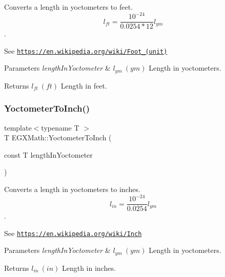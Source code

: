 Converts a length in yoctometers to feet. \[ l_{ft}= \frac{10^{-24}}{0.0254 * 12} l_{ym} \]. 

See \href{https://en.wikipedia.org/wiki/Foot_(unit)}{\tt https\+://en.\+wikipedia.\+org/wiki/\+Foot\+\_\+(unit)} 
\begin{DoxyParams}{Parameters}
{\em length\+In\+Yoctometer} & $ l_{ym}\ (ym)$ Length in yoctometers. \\
\hline
\end{DoxyParams}
\begin{DoxyReturn}{Returns}
$ l_{ft}\ (ft)$ Length in feet. 
\end{DoxyReturn}
\mbox{\label{group___e_g_x_math-_conversions-_length_conversions-_s_i-_yoctometer-_imperial_gaaaba7544cf3189cd374782786a13646c}} 
\subsubsection{\texorpdfstring{Yoctometer\+To\+Inch()}{YoctometerToInch()}}
{\footnotesize\ttfamily template$<$typename T $>$ \\
T E\+G\+X\+Math\+::\+Yoctometer\+To\+Inch (\begin{DoxyParamCaption}\item[{const T}]{length\+In\+Yoctometer }\end{DoxyParamCaption})}



Converts a length in yoctometers to inches. \[ l_{in}= \frac{10^{-24}}{0.0254} l_{ym} \]. 

See \href{https://en.wikipedia.org/wiki/Inch}{\tt https\+://en.\+wikipedia.\+org/wiki/\+Inch} 
\begin{DoxyParams}{Parameters}
{\em length\+In\+Yoctometer} & $ l_{ym}\ (ym)$ Length in yoctometers. \\
\hline
\end{DoxyParams}
\begin{DoxyReturn}{Returns}
$ l_{in}\ (in)$ Length in inches. 
\end{DoxyReturn}
\mbox{\label{group___e_g_x_math-_conversions-_length_conversions-_s_i-_yoctometer-_imperial_gacb2a1154ec79cfd130de96e92dfeedfa}} 
